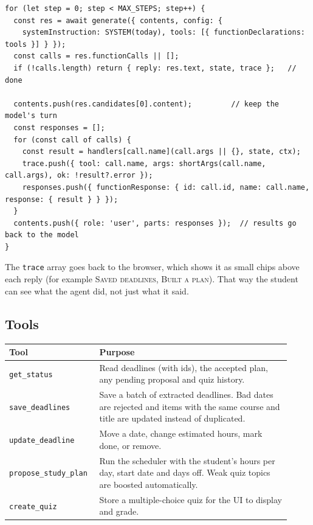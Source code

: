 \documentclass[11pt]{article}
\begin{document}
\begin{lstlisting}
for (let step = 0; step < MAX_STEPS; step++) {
  const res = await generate({ contents, config: {
    systemInstruction: SYSTEM(today), tools: [{ functionDeclarations: tools }] } });
  const calls = res.functionCalls || [];
  if (!calls.length) return { reply: res.text, state, trace };   // done

  contents.push(res.candidates[0].content);         // keep the model's turn
  const responses = [];
  for (const call of calls) {
    const result = handlers[call.name](call.args || {}, state, ctx);
    trace.push({ tool: call.name, args: shortArgs(call.name, call.args), ok: !result?.error });
    responses.push({ functionResponse: { id: call.id, name: call.name, response: { result } } });
  }
  contents.push({ role: 'user', parts: responses });  // results go back to the model
}
\end{lstlisting}

The \texttt{trace} array goes back to the browser, which shows it as small chips above each
reply (for example \textsc{Saved deadlines}, \textsc{Built a plan}). That way the student can
see what the agent did, not just what it said.

\subsection{Tools}
\begin{center}
\begin{tabular}{@{}p{0.27\linewidth}p{0.65\linewidth}@{}}
\toprule
\textbf{Tool} & \textbf{Purpose} \\
\midrule
\texttt{get\_status} & Read deadlines (with ids), the accepted plan, any pending proposal and quiz history. \\
\texttt{save\_deadlines} & Save a batch of extracted deadlines. Bad dates are rejected and items with the same course and title are updated instead of duplicated. \\
\texttt{update\_deadline} & Move a date, change estimated hours, mark done, or remove. \\
\texttt{propose\_study\_plan} & Run the scheduler with the student's hours per day, start date and days off. Weak quiz topics are boosted automatically. \\
\texttt{create\_quiz} & Store a multiple-choice quiz for the UI to display and grade. \\
\bottomrule
\end{tabular}
\end{center}
\end{document}
